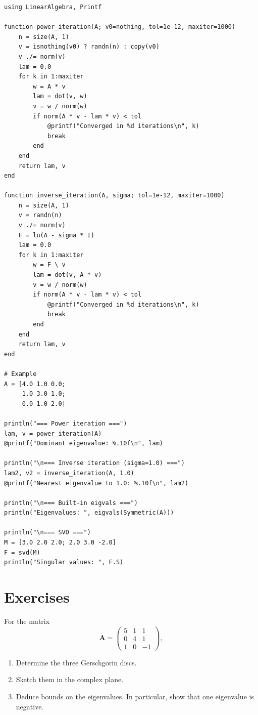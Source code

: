 \begin{codeblock}[title=\textbf{Julia --- Eigenvalue algorithms}]
\begin{verbatim}
using LinearAlgebra, Printf

function power_iteration(A; v0=nothing, tol=1e-12, maxiter=1000)
    n = size(A, 1)
    v = isnothing(v0) ? randn(n) : copy(v0)
    v ./= norm(v)
    lam = 0.0
    for k in 1:maxiter
        w = A * v
        lam = dot(v, w)
        v = w / norm(w)
        if norm(A * v - lam * v) < tol
            @printf("Converged in %d iterations\n", k)
            break
        end
    end
    return lam, v
end

function inverse_iteration(A, sigma; tol=1e-12, maxiter=1000)
    n = size(A, 1)
    v = randn(n)
    v ./= norm(v)
    F = lu(A - sigma * I)
    lam = 0.0
    for k in 1:maxiter
        w = F \ v
        lam = dot(v, A * v)
        v = w / norm(w)
        if norm(A * v - lam * v) < tol
            @printf("Converged in %d iterations\n", k)
            break
        end
    end
    return lam, v
end

# Example
A = [4.0 1.0 0.0;
     1.0 3.0 1.0;
     0.0 1.0 2.0]

println("=== Power iteration ===")
lam, v = power_iteration(A)
@printf("Dominant eigenvalue: %.10f\n", lam)

println("\n=== Inverse iteration (sigma=1.0) ===")
lam2, v2 = inverse_iteration(A, 1.0)
@printf("Nearest eigenvalue to 1.0: %.10f\n", lam2)

println("\n=== Built-in eigvals ===")
println("Eigenvalues: ", eigvals(Symmetric(A)))

println("\n=== SVD ===")
M = [3.0 2.0 2.0; 2.0 3.0 -2.0]
F = svd(M)
println("Singular values: ", F.S)
\end{verbatim}
\end{codeblock}

\section{Exercises}

\begin{exercise}[$\star$]
\label{ex:ch10-gerschgorin}
For the matrix
\[
    \mathbf{A} = \begin{pmatrix} 5 & 1 & 1 \\ 0 & 4 & 1 \\ 1 & 0 & -1 \end{pmatrix},
\]
\begin{enumerate}
    \item Determine the three Gerschgorin discs.
    \item Sketch them in the complex plane.
    \item Deduce bounds on the eigenvalues. In particular, show that one eigenvalue is negative.
\end{enumerate}
\end{exercise}

